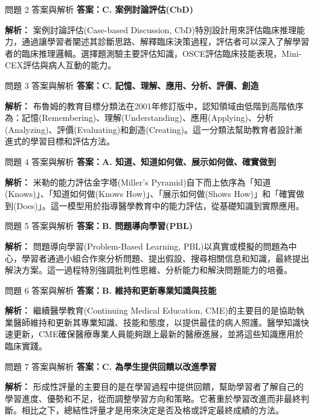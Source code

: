 \documentclass[aspectratio=169]{beamer}
\begin{document}
\begin{frame}{問題 2 答案與解析}
  \textbf{答案：C. 案例討論評估(CbD)}
  
  \textbf{解析：} 案例討論評估(Case-based Discussion, CbD)特別設計用來評估臨床推理能力，通過讓學習者闡述其診斷思路、解釋臨床決策過程，評估者可以深入了解學習者的臨床推理邏輯。選擇題測驗主要評估知識，OSCE評估臨床技能表現，Mini-CEX評估與病人互動的能力。
\end{frame}

\begin{frame}{問題 3 答案與解析}
  \textbf{答案：C. 記憶、理解、應用、分析、評價、創造}
  
  \textbf{解析：} 布魯姆的教育目標分類法在2001年修訂版中，認知領域由低階到高階依序為：記憶(Remembering)、理解(Understanding)、應用(Applying)、分析(Analyzing)、評價(Evaluating)和創造(Creating)。這一分類法幫助教育者設計漸進式的學習目標和評估方法。
\end{frame}

\begin{frame}{問題 4 答案與解析}
  \textbf{答案：A. 知道、知道如何做、展示如何做、確實做到}
  
  \textbf{解析：} 米勒的能力評估金字塔(Miller's Pyramid)自下而上依序為「知道(Knows)」、「知道如何做(Knows How)」、「展示如何做(Shows How)」和「確實做到(Does)」。這一模型用於指導醫學教育中的能力評估，從基礎知識到實際應用。
\end{frame}

\begin{frame}{問題 5 答案與解析}
  \textbf{答案：B. 問題導向學習(PBL)}
  
  \textbf{解析：} 問題導向學習(Problem-Based Learning, PBL)以真實或模擬的問題為中心，學習者通過小組合作來分析問題、提出假設、搜尋相關信息和知識，最終提出解決方案。這一過程特別強調批判性思維、分析能力和解決問題能力的培養。
\end{frame}

\begin{frame}{問題 6 答案與解析}
  \textbf{答案：B. 維持和更新專業知識與技能}
  
  \textbf{解析：} 繼續醫學教育(Continuing Medical Education, CME)的主要目的是協助執業醫師維持和更新其專業知識、技能和態度，以提供最佳的病人照護。醫學知識快速更新，CME確保醫療專業人員能夠跟上最新的醫療進展，並將這些知識應用於臨床實踐。
\end{frame}

\begin{frame}{問題 7 答案與解析}
  \textbf{答案：C. 為學生提供回饋以改進學習}
  
  \textbf{解析：} 形成性評量的主要目的是在學習過程中提供回饋，幫助學習者了解自己的學習進度、優勢和不足，從而調整學習方向和策略。它著重於學習改進而非最終判斷。相比之下，總結性評量才是用來決定是否及格或評定最終成績的方法。
\end{frame}
\end{document}
